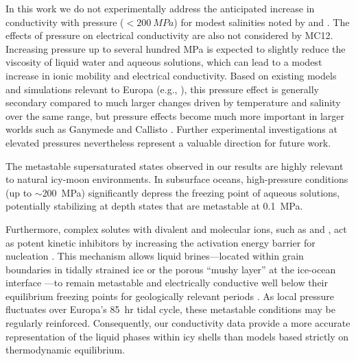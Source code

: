 \documentclass[journal=aesccq,manuscript=article]{achemso}
\begin{document}
In this work we do not experimentally address the anticipated increase in conductivity with pressure ($<\SI{200}{MPa}$) for modest salinities noted by \citet{adams1931effect,horne1967electrical} and \citet{ueno1979effect}. 
The effects of pressure on electrical conductivity are also not considered by MC12.
Increasing pressure up to several hundred MPa is expected to slightly reduce the viscosity of liquid water and aqueous solutions, which can lead to a modest increase in ionic mobility and electrical conductivity. 
Based on existing models and simulations relevant to Europa (e.g., \citep{psarakis2024electrical}), this pressure effect is generally secondary compared to much larger changes driven by temperature and salinity over the same range, but pressure effects become much more important in larger worlds such as Ganymede and Callisto \citep{vance2021magnetic}. 
Further experimental investigations at elevated pressures nevertheless represent a valuable direction for future work.


The metastable supersaturated states observed in our results are highly relevant to natural icy-moon environments. In subsurface oceans, high-pressure conditions (up to $\sim$\SI{200}{MPa}) significantly depress the freezing point of aqueous solutions, potentially stabilizing at depth states that are metastable at \SI{0.1}{MPa}. 

Furthermore, complex solutes with divalent and molecular ions, such as  and , act as potent kinetic inhibitors by increasing the activation energy barrier for nucleation \citep{toner2017lowtemperaturesulfate}. This mechanism allows liquid brines—located within grain boundaries in tidally strained ice \citep{mccarthy2016tidal} or the porous ``mushy layer'' at the ice-ocean interface \cite{Buffo2021}—to remain metastable and electrically conductive well below their equilibrium freezing points for geologically relevant periods \citep{toner_formation_2014}. As local pressure fluctuates over Europa’s \SI{85}{hr} tidal cycle, these metastable conditions may be regularly reinforced. Consequently, our conductivity data provide a more accurate representation of the liquid phases within icy shells than models based strictly on thermodynamic equilibrium.
\end{document}
